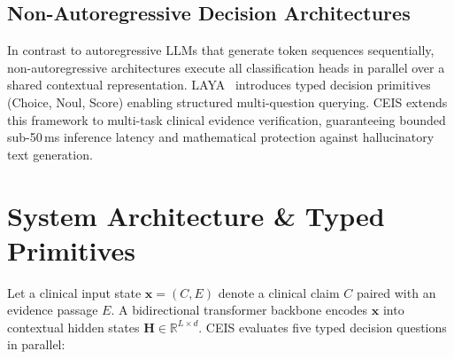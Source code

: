 \documentclass[10pt,conference]{IEEEtran}
\begin{document}
\subsection{Non-Autoregressive Decision Architectures}
In contrast to autoregressive LLMs that generate token sequences sequentially, non-autoregressive architectures execute all classification heads in parallel over a shared contextual representation. LAYA~\cite{laya2026} introduces typed decision primitives (Choice, Noul, Score) enabling structured multi-question querying. CEIS extends this framework to multi-task clinical evidence verification, guaranteeing bounded sub-50\,ms inference latency and mathematical protection against hallucinatory text generation.

\section{System Architecture \& Typed Primitives}
Let a clinical input state $\mathbf{x} = (C, E)$ denote a clinical claim $C$ paired with an evidence passage $E$. A bidirectional transformer backbone encodes $\mathbf{x}$ into contextual hidden states $\mathbf{H} \in \mathbb{R}^{L \times d}$. CEIS evaluates five typed decision questions in parallel:

\begin{table}[t]
\centering
\caption{Typed Clinical Decision Primitives in CEIS}
\label{tab:primitives}
\end{table}
\end{document}
